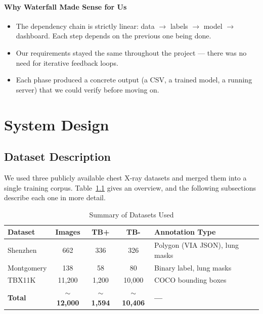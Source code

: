\documentclass[12pt]{report}
\begin{document}
\subsubsection*{Why Waterfall Made Sense for Us}
\begin{itemize}
    \item The dependency chain is strictly linear: data $\rightarrow$ labels $\rightarrow$ model $\rightarrow$ dashboard. Each step depends on the previous one being done.
    \item Our requirements stayed the same throughout the project --- there was no need for iterative feedback loops.
    \item Each phase produced a concrete output (a CSV, a trained model, a running server) that we could verify before moving on.
\end{itemize}

\chapter{System Design}
\doublespacing

\section{Dataset Description}

We used three publicly available chest X-ray datasets and merged them into a single training corpus. Table~\ref{tab:datasets} gives an overview, and the following subsections describe each one in more detail.

\begin{table}[H]
\centering
\caption{Summary of Datasets Used}
\label{tab:datasets}
\small
\renewcommand{\arraystretch}{1.2}
\begin{tabular}{|l|c|c|c|p{4.5cm}|}
\hline
\textbf{Dataset} & \textbf{Images} & \textbf{TB+} & \textbf{TB-} & \textbf{Annotation Type} \\
\hline
Shenzhen & 662 & 336 & 326 & Polygon (VIA JSON), lung masks \\
Montgomery & 138 & 58 & 80 & Binary label, lung masks \\
TBX11K & 11,200 & 1,200 & 10,000 & COCO bounding boxes \\
\hline
\textbf{Total} & \textbf{$\sim$12,000} & \textbf{$\sim$1,594} & \textbf{$\sim$10,406} & \textbf{---} \\
\hline
\end{tabular}
\end{table}
\end{document}
